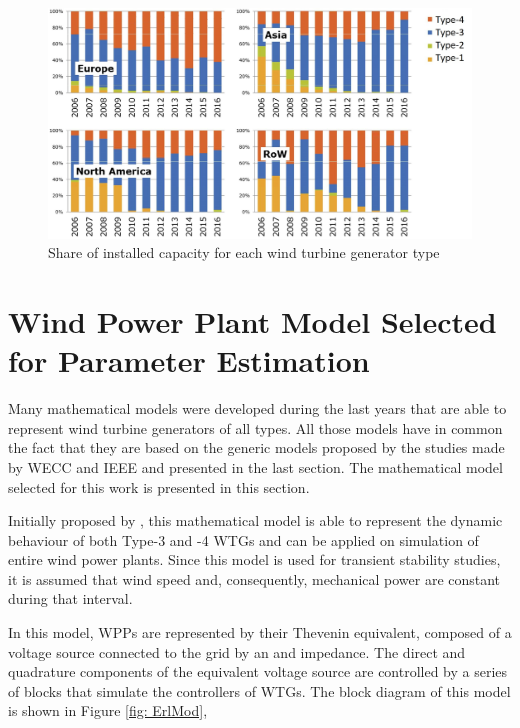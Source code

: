 \begin{figure}[h]
	\caption{Share of installed capacity for each wind turbine generator type}
	\begin{center}
		\includegraphics[scale=.2]{Images/WTGTypes.jpg}
	\end{center}
	\label{fig: WindShare}
\end{figure}

\section{Wind Power Plant Model Selected for Parameter Estimation}

Many mathematical models were developed during the last years that are able to represent wind turbine generators of all types. All those models have in common the fact that they are based on the generic models proposed by the studies made by WECC and IEEE and presented in the last section. The mathematical model selected for this work is presented in this section.

Initially proposed by \cite{Erlich2012}, this mathematical model is able to represent the dynamic behaviour of both Type-3 and -4 WTGs and can be applied on simulation of entire wind power plants. Since this model is used for transient stability studies, it is assumed that wind speed and, consequently, mechanical power are constant during that interval.

In this model, WPPs are represented by their Thevenin equivalent, composed of  a voltage source connected to the grid by an and impedance. The direct and quadrature components of the equivalent voltage source are controlled by a series of blocks that simulate the controllers of WTGs. The block diagram of this model is shown in Figure \ref{fig: ErlMod},

